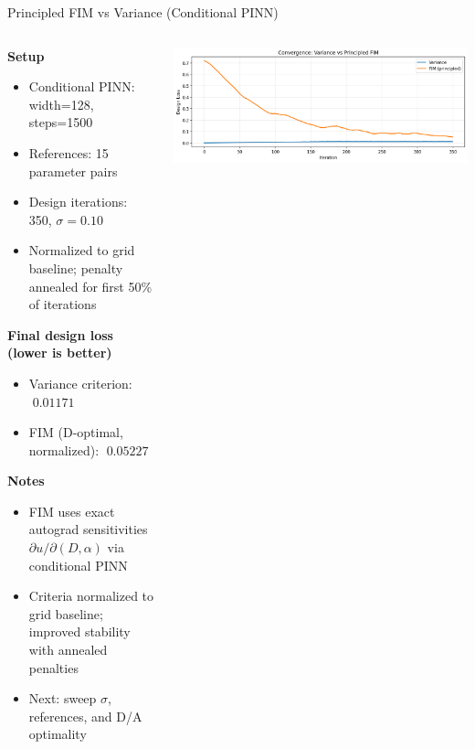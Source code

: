 \documentclass[aspectratio=169]{beamer}
\begin{document}
\begin{frame}{Principled FIM vs Variance (Conditional PINN)}
\begin{columns}
\begin{column}{0.55\textwidth}
\textbf{Setup}
\begin{itemize}
    \item Conditional PINN: width=128, steps=1500
    \item References: 15 parameter pairs
    \item Design iterations: 350, $\sigma=0.10$
    \item Normalized to grid baseline; penalty annealed for first 50\% of iterations
\end{itemize}

\vspace{0.2cm}
\textbf{Final design loss (lower is better)}
\begin{itemize}
    \item Variance criterion: $\;0.01171$
    \item FIM (D-optimal, normalized): $\;0.05227$
\end{itemize}

\vspace{0.2cm}
\textbf{Notes}
\begin{itemize}
    \item FIM uses exact autograd sensitivities $\partial u/\partial (D,\alpha)$ via conditional PINN
    \item Criteria normalized to grid baseline; improved stability with annealed penalties
    \item Next: sweep $\sigma$, references, and D/A optimality
\end{itemize}
\end{column}
\begin{column}{0.45\textwidth}
\centering
\includegraphics[width=\textwidth]{fim_convergence.png}
\end{column}
\end{columns}
\end{frame}
\end{document}
